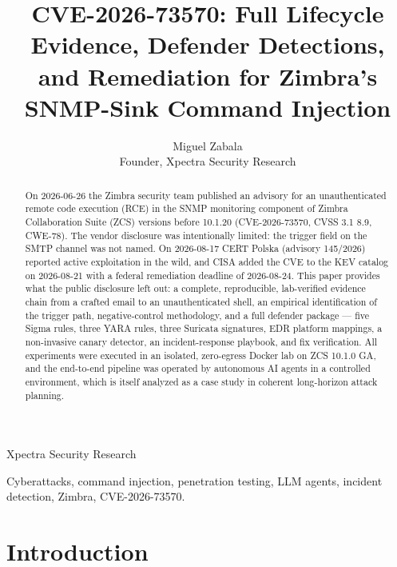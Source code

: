 \documentclass[journal]{IEEEtran}
\begin{document}
\title{CVE-2026-73570: Full Lifecycle Evidence, Defender Detections, and
Remediation for Zimbra's SNMP-Sink Command Injection}

\author{Miguel Zabala\\[0.5ex]
\small Founder, Xpectra Security Research}

{Xpectra Security Research \MakeLowercase\expandafter\the\year}

\maketitle

\begin{abstract}
On 2026-06-26 the Zimbra security team published an advisory for an unauthenticated
remote code execution (RCE) in the SNMP monitoring component of Zimbra
Collaboration Suite (ZCS) versions before 10.1.20 (CVE-2026-73570, CVSS 3.1 8.9,
CWE-78). The vendor disclosure was intentionally limited: the trigger field on the
SMTP channel was not named. On 2026-08-17 CERT Polska (advisory 145/2026) reported
active exploitation in the wild, and CISA added the CVE to the KEV catalog on
2026-08-21 with a federal remediation deadline of 2026-08-24. This paper provides
what the public disclosure left out: a complete, reproducible, lab-verified
evidence chain from a crafted email to an unauthenticated shell, an empirical
identification of the trigger path, negative-control methodology, and a full
defender package — five Sigma rules, three YARA rules, three Suricata signatures,
EDR platform mappings, a non-invasive canary detector, an incident-response
playbook, and fix verification. All experiments were executed in an isolated,
zero-egress Docker lab on ZCS 10.1.0 GA, and the end-to-end pipeline was operated
by autonomous AI agents in a controlled environment, which is itself analyzed as a
case study in coherent long-horizon attack planning.
\end{abstract}

\begin{IEEEkeywords}
Cyberattacks, command injection, penetration testing, LLM agents,
incident detection, Zimbra, CVE-2026-73570.
\end{IEEEkeywords}

\section{Introduction}
\label{sec:intro}
\end{document}
